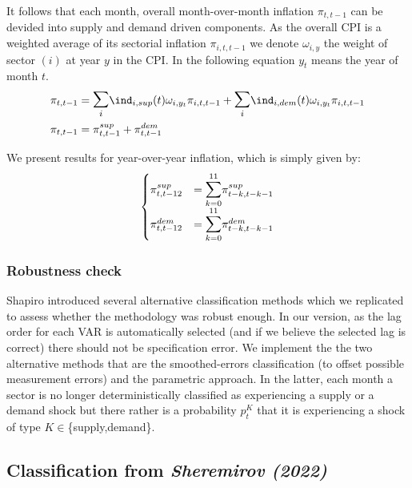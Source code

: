 It follows that each month, overall month-over-month inflation $\pi_{t,t-1}$ can be devided into supply and demand driven components. 
As the overall CPI is a weighted average of its sectorial inflation $\pi_{i,t,t-1}$ we denote $\omega_{i,y}$ the weight of sector $(i)$ at year $y$ in the CPI.
In the following equation $y_t$ means the year of month $t$.
\begin{align*}
    \pi_{t,t-1} &= \mathlarger{\mathlarger{\sum}}_{i} \ind_{i,sup}(t) \omega_{i,y_t} \pi_{i,t,t-1} + \mathlarger{\mathlarger{\sum}}_{i} \ind_{i,dem}(t) \omega_{i,y_t} \pi_{i,t,t-1} \\
    \pi_{t,t-1} &= \pi_{t,t-1}^{sup} + \pi_{t,t-1}^{dem}
\end{align*}

We present results for year-over-year inflation, which is simply given by:
\begin{align*}
    \begin{cases}
        \pi_{t,t-12}^{sup} &= \mathlarger{\mathlarger{\sum}}_{k=0}^{11} \pi_{t-k,t-k-1}^{sup} \\
        \pi_{t,t-12}^{dem} &= \mathlarger{\mathlarger{\sum}}_{k=0}^{11} \pi_{t-k,t-k-1}^{dem}
    \end{cases}
\end{align*}

\subsubsection{Robustness check}

\quad Shapiro introduced several alternative classification methods which we replicated to assess whether the methodology was robust enough.
In our version, as the lag order for each VAR is automatically selected (and if we believe the selected lag is correct) there should not be specification error.
\bigbreak
We implement the the two alternative methods that are the smoothed-errors classification (to offset possible measurement errors) and the parametric approach. 
In the latter, each month a sector is no longer deterministically classified as experiencing a supply or a demand shock but there rather is a probability $p_t^K$ that it is experiencing a shock of type $K \in$\{supply,demand\}.


\subsection{Classification from \textit{Sheremirov (2022)}}


